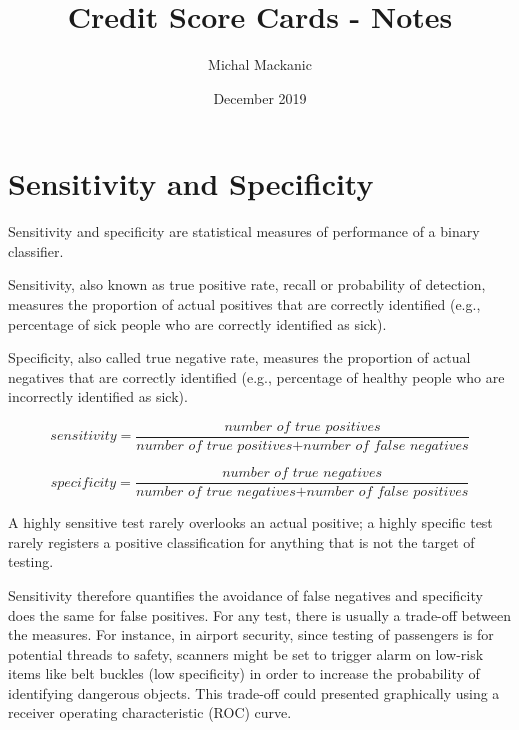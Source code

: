 \documentclass[a4paper]{article}
\begin{document}
\title{Credit Score Cards - Notes}
\author{Michal Mackanic}
\date{December 2019}
\maketitle

\tableofcontents{}

\section{Sensitivity and Specificity}

Sensitivity and specificity are statistical measures of performance of a binary classifier.

Sensitivity, also known as true positive rate, recall or probability of detection, measures the proportion of actual positives that are correctly identified (e.g., percentage of sick people who are correctly identified as sick).

Specificity, also called true negative rate, measures the proportion of actual negatives that are correctly identified (e.g., percentage of healthy people who are incorrectly identified as sick).

\begin{equation}
\textit{sensitivity} = \frac{\textit{number of true positives}}{\textit{number of true positives} + \textit{number of false negatives}}
\end{equation}

\begin{equation}
\textit{specificity} = \frac{\textit{number of true negatives}}{\textit{number of true negatives} + \textit{number of false positives}}
\end{equation}

A highly sensitive test rarely overlooks an actual positive; a highly specific test rarely registers a positive classification for anything that is not the target of testing.

Sensitivity therefore quantifies the avoidance of false negatives and specificity does the same for false positives. For any test, there is usually a trade-off between the measures. For instance, in airport security, since testing of passengers is for potential threads to safety, scanners might be set to trigger alarm on low-risk items like belt buckles (low specificity) in order to increase the probability of identifying dangerous objects. This trade-off could presented graphically using a receiver operating characteristic (ROC) curve.
\end{document}

